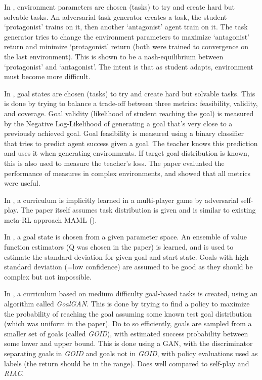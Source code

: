 \documentclass[letterpaper]{article}
\theoremstyle{definition}
\begin{document}
In \cite{Dennis2020}, environment parameters are chosen (tasks) to try and create hard but solvable tasks. An adversarial task generator creates a task, the student `protagonist' trains on it, then another `antagonist' agent train on it. The task generator tries to change the environment parameters to maximize `antagonist' return and minimize `protagonist' return (both were trained to convergence on the last environment). This is shown to be a nash-equilibrium between `protagonist' and `antagonist'. The intent is that as student adapts, environment must become more difficult.

In \cite{Racaniere2019}, goal states are chosen (tasks) to try and create hard but solvable tasks. 
This is done by trying to balance a trade-off between three metrics: feasibility, validity, and coverage.
Goal validity (likelihood of student reaching the goal) is measured by the Negative Log-Likelihood of generating a goal that's very close to a previously achieved goal.
Goal feasibility is measured using a binary classifier that tries to predict agent success given a goal. The teacher knows this prediction and uses it when generating environments.
If target goal distribution is known, this is also used to measure the teacher's loss.
The paper evaluated the performance of measures in complex environments, and showed that all metrics were useful.

In \cite{Al-Shedivat2017}, a curriculum is implicitly learned in a multi-player game by adversarial self-play. The paper itself assumes task distribution is given and is similar to existing meta-RL approach MAML (\cite{Finn2017a}).

In \cite{Zhang2020}, a goal state is chosen from a given parameter space. An ensemble of value function estimators (Q was chosen in the paper) is learned, and is used to estimate the standard deviation for given goal and start state. Goals with high standard deviation (=low confidence) are assumed to be good as they should be complex but not impossible.

In \cite{Florensa2017, Florensa2018}, a curriculum based on medium difficulty goal-based tasks is created, using an algorithm called \textit{GoalGAN}. This is done by trying to find a policy to maximize the probability of reaching the goal assuming some known test goal distribution (which was uniform in the paper). Do to so efficiently, goals are sampled from a smaller set of goals (called \textit{GOID}), with estimated success probability between some lower and upper bound. This is done using a GAN, with the discriminator separating goals in \textit{GOID} and goals not in \textit{GOID}, with policy evaluations used as labels (the return should be in the range). Does well compared to self-play and \textit{RIAC}.
\end{document}
